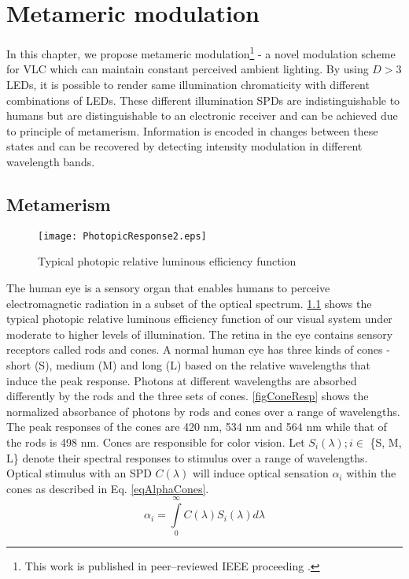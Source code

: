 \chapter[Optical color MIMO: Metameric modulation]{Metameric modulation}
\label{chapter:metameric}
\thispagestyle{myheadings}
\graphicspath{{_MIMOColor/figures_mm/}}
In this chapter, we propose metameric modulation\footnote{This work is published in peer--reviewed IEEE proceeding \cite{but12a}.} - a novel modulation scheme for VLC which can maintain constant perceived ambient lighting. By using $D > 3$ LEDs, it is possible to render same illumination chromaticity with different combinations of LEDs. These different illumination SPDs are indistinguishable to humans but are distinguishable to an electronic receiver and can be achieved due to principle of metamerism. Information is encoded in changes between these states and can be recovered by detecting intensity modulation in different wavelength bands.

\section{Metamerism}
\label{subsec:metamericEye}
\begin{figure}[!t]
	\centering
    \texttt{[image: PhotopicResponse2.eps]}
	\caption{Typical photopic relative luminous efficiency function}
	\label{figPhotopicCurve}
\end{figure}
The human eye is a sensory organ that enables humans to perceive electromagnetic radiation in a subset of the optical spectrum. \figurename{ \ref{figPhotopicCurve}} \cite{jai89a} shows the typical photopic relative luminous efficiency function of our visual system under moderate to higher levels of illumination. The retina in the eye contains sensory receptors called rods and cones. A normal human eye has three kinds of cones - short (S), medium (M) and long (L) based on the relative wavelengths that induce the peak response. Photons at different wavelengths are absorbed differently by the rods and the three sets of cones. \figurename{ \ref{figConeResp}} \cite{wan96a} shows the normalized absorbance of photons by rods and cones over a range of wavelengths. The peak responses of the cones are 420 nm, 534 nm and 564 nm while that of the rods is 498 nm. Cones are responsible for color vision. Let $S_{i}(\lambda); i\in$ \{S, M, L\}  denote their spectral responses to stimulus over a range of wavelengths. Optical stimulus with an SPD $C(\lambda)$ will induce optical sensation $\alpha_{i}$ within the cones as described in Eq. \eqref{eqAlphaCones}.
\begin{equation}
	\label{eqAlphaCones}
	\alpha_{i} = \int\limits_{0}^{\infty} C(\lambda)S_{i}(\lambda)d\lambda
\end{equation}


